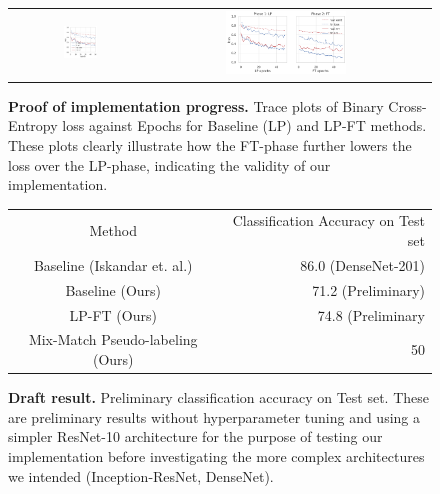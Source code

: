 \documentclass{article}
\begin{document}
\begin{figure}[!h]
    \begin{tabular}{c c c}    
    \includegraphics[width=0.25\textwidth]{Checkpoint2_Baseline.png}
    &
    \includegraphics[width=0.48\textwidth]{Checkpoint2_LPFT.png}
    \end{tabular}
    \caption{\textbf{Proof of implementation progress.} Trace plots of Binary Cross-Entropy loss against Epochs for Baseline (LP) and LP-FT methods. These plots clearly illustrate how the FT-phase further lowers the loss over the LP-phase, indicating the validity of our implementation.}
\end{figure}



\begin{figure}[!h]
    \begin{tabular}{c r}
    Method & Classification Accuracy on Test set
    \\
    Baseline (Iskandar et. al.) & 86.0 (DenseNet-201)
    \\
    Baseline (Ours) & 71.2 (Preliminary)
    \\
    LP-FT (Ours) & 74.8 (Preliminary
    \\
    Mix-Match Pseudo-labeling (Ours) & 50
    \end{tabular}
    \caption{\textbf{Draft result.} Preliminary classification accuracy on Test set. These are preliminary results without hyperparameter tuning and using a simpler ResNet-10 architecture for the purpose of testing our implementation before investigating the more complex architectures we intended (Inception-ResNet, DenseNet). }
\end{figure}
\end{document}
